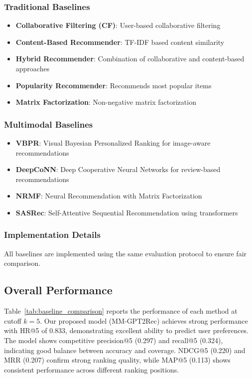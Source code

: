 \documentclass[conference]{IEEEtran}
\begin{document}
\subsubsection{Traditional Baselines}
\begin{itemize}
    \item \textbf{Collaborative Filtering (CF)}: User-based collaborative filtering
    \item \textbf{Content-Based Recommender}: TF-IDF based content similarity
    \item \textbf{Hybrid Recommender}: Combination of collaborative and content-based approaches
    \item \textbf{Popularity Recommender}: Recommends most popular items
    \item \textbf{Matrix Factorization}: Non-negative matrix factorization
\end{itemize}

\subsubsection{Multimodal Baselines}
\begin{itemize}
    \item \textbf{VBPR}: Visual Bayesian Personalized Ranking for image-aware recommendations
    \item \textbf{DeepCoNN}: Deep Cooperative Neural Networks for review-based recommendations
    \item \textbf{NRMF}: Neural Recommendation with Matrix Factorization
    \item \textbf{SASRec}: Self-Attentive Sequential Recommendation using transformers
\end{itemize}

\subsubsection{Implementation Details}
All baselines are implemented using the same evaluation protocol to ensure fair comparison. 

\subsection{Overall Performance}
Table~\ref{tab:baseline_comparison} reports the performance of each method at cutoff $k=5$. Our proposed model (MM-GPT2Rec) achieves strong performance with HR@5 of 0.833, demonstrating excellent ability to predict user preferences. The model shows competitive precision@5 (0.297) and recall@5 (0.324), indicating good balance between accuracy and coverage. NDCG@5 (0.220) and MRR (0.207) confirm strong ranking quality, while MAP@5 (0.113) shows consistent performance across different ranking positions.
\end{document}
